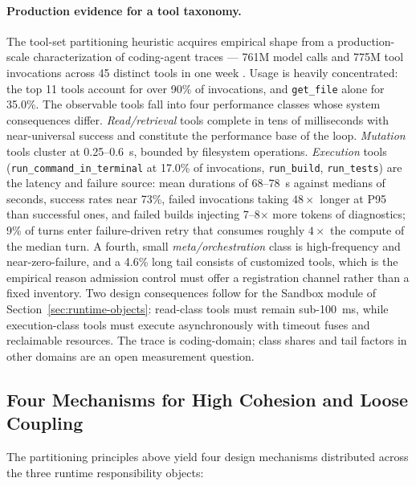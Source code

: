 \paragraph{Production evidence for a tool taxonomy.}
The tool-set partitioning heuristic acquires empirical shape from a production-scale characterization of coding-agent traces --- 761M model calls and 775M tool invocations across 45 distinct tools in one week \cite{agenticcoding2026wild}. Usage is heavily concentrated: the top 11 tools account for over 90\% of invocations, and \texttt{get\_file} alone for 35.0\%. The observable tools fall into four performance classes whose system consequences differ. \textit{Read/retrieval} tools complete in tens of milliseconds with near-universal success and constitute the performance base of the loop. \textit{Mutation} tools cluster at 0.25--0.6~s, bounded by filesystem operations. \textit{Execution} tools (\texttt{run\_command\_in\_terminal} at 17.0\% of invocations, \texttt{run\_build}, \texttt{run\_tests}) are the latency and failure source: mean durations of 68--78~s against medians of seconds, success rates near 73\%, failed invocations taking $48\times$ longer at P95 than successful ones, and failed builds injecting 7--8$\times$ more tokens of diagnostics; 9\% of turns enter failure-driven retry that consumes roughly $4\times$ the compute of the median turn. A fourth, small \textit{meta/orchestration} class is high-frequency and near-zero-failure, and a 4.6\% long tail consists of customized tools, which is the empirical reason admission control must offer a registration channel rather than a fixed inventory. Two design consequences follow for the Sandbox module of Section~\ref{sec:runtime-objects}: read-class tools must remain sub-100~ms, while execution-class tools must execute asynchronously with timeout fuses and reclaimable resources. The trace is coding-domain; class shares and tail factors in other domains are an open measurement question.

\subsection{Four Mechanisms for High Cohesion and Loose Coupling}

The partitioning principles above yield four design mechanisms distributed across the three runtime responsibility objects:

